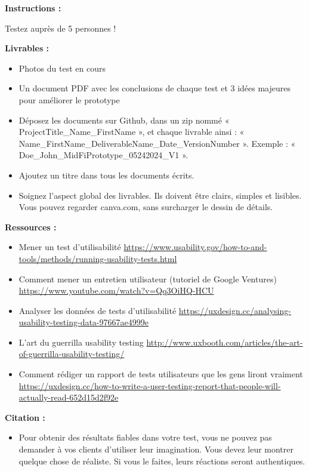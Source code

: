 \makeheaderfiles

\textbf{Instructions :}

Testez auprès de 5 personnes !

\textbf{Livrables :}

\begin{itemize}
\item Photos du test en cours
\item Un document PDF avec les conclusions de chaque test et 3 idées majeures pour améliorer le prototype
\item Déposez les documents sur Github, dans un zip nommé « ProjectTitle\_Name\_FirstName », et chaque livrable ainsi : « Name\_FirstName\_DeliverableName\_Date\_VersionNumber ». Exemple : « Doe\_John\_MidFiPrototype\_05242024\_V1 ».
\item Ajoutez un titre dans tous les documents écrits.
\item Soignez l'aspect global des livrables. Ils doivent être clairs, simples et lisibles. Vous pouvez regarder canva.com, sans surcharger le dessin de détails.
\end{itemize}

\textbf{Ressources :}

\begin{itemize}
\item Mener un test d'utilisabilité \url{https://www.usability.gov/how-to-and-tools/methods/running-usability-tests.html}
\item Comment mener un entretien utilisateur (tutoriel de Google Ventures) \url{https://www.youtube.com/watch?v=Qq3OiHQ-HCU}
\item Analyser les données de tests d'utilisabilité \url{https://uxdesign.cc/analysing-usability-testing-data-97667ae4999e}
\item L'art du guerrilla usability testing \url{http://www.uxbooth.com/articles/the-art-of-guerrilla-usability-testing/}
\item Comment rédiger un rapport de tests utilisateurs que les gens liront vraiment \url{https://uxdesign.cc/how-to-write-a-user-testing-report-that-people-will-actually-read-652d15d2f92e}
\end{itemize}

\textbf{Citation :}

\begin{itemize}
\item Pour obtenir des résultats fiables dans votre test, vous ne pouvez pas demander à vos clients d'utiliser leur imagination. Vous devez leur montrer quelque chose de réaliste. Si vous le faites, leurs réactions seront authentiques.
\end{itemize}

